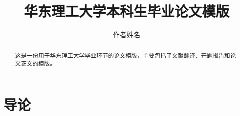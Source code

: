 \documentclass[a4paper]{ecustthesis}
\author{作者姓名}
\title{华东理工大学本科生毕业论文模版}
\begin{document}
\setlength{\parindent}{2em}


\maketitle

\begin{abstract}
  这是一份用于华东理工大学毕业环节的论文模版，主要包括了文献翻译、开题报告和论文正文的模版。
\end{abstract}

\section{导论}
\end{document}
